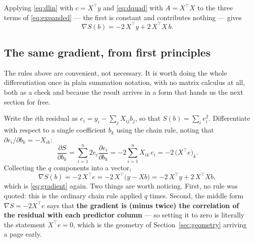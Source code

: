 \documentclass[11pt]{article}
\newcommand{\Xt}{X^{\!\top}}
\begin{document}
Applying \eqref{eq:dlin} with $c = \Xt y$ and \eqref{eq:dquad} with
$A = \Xt X$ to the three terms of \eqref{eq:expanded} --- the first is
constant and contributes nothing --- gives
\begin{equation}
  \label{eq:gradient}
  \nabla S(b) = -2\,\Xt y + 2\,\Xt X\,b .
\end{equation}

\subsection{The same gradient, from first principles}
\label{sec:indexgrad}

The rules above are convenient, not necessary. It is worth doing the whole
differentiation once in plain summation notation, with no matrix calculus at
all, both as a check and because the result arrives in a form that hands us
the next section for free.

Write the $i$th residual as $e_i = y_i - \sum_j X_{ij}b_j$, so that
$S(b) = \sum_i e_i^2$. Differentiate with respect to a single coefficient
$b_k$ using the chain rule, noting that $\partial e_i/\partial b_k = -X_{ik}$:
\[
  \frac{\partial S}{\partial b_k}
  = \sum_{i=1}^{n} 2 e_i \frac{\partial e_i}{\partial b_k}
  = -2\sum_{i=1}^{n} X_{ik}\,e_i
  = -2\,\bigl(\Xt e\bigr)_k .
\]
Collecting the $q$ components into a vector,
\begin{equation}
  \label{eq:gradres}
  \nabla S(b) = -2\,\Xt e = -2\,\Xt\bigl(y - Xb\bigr)
              = -2\,\Xt y + 2\,\Xt X b ,
\end{equation}
which is \eqref{eq:gradient} again. Two things are worth noticing. First, no
rule was quoted: this is the ordinary chain rule applied $q$ times. Second,
the middle form $\nabla S = -2\Xt e$ says that \textbf{the gradient is (minus
twice) the correlation of the residual with each predictor column} --- so
setting it to zero is literally the statement $\Xt e = 0$, which is the
geometry of Section~\ref{sec:geometry} arriving a page early.
\end{document}
